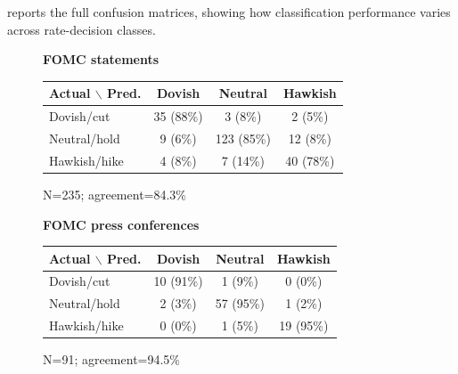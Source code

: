  reports the full confusion matrices, showing how
classification performance varies across rate-decision classes.

\begin{figure}[H]
  \centering
\begin{minipage}{0.48\textwidth}
\centering
\scriptsize
\textbf{FOMC statements}\par
\vspace{0.08cm}
\begin{tabular}{lccc}
\toprule
Actual $\backslash$ Pred. & Dovish & Neutral & Hawkish \\
\midrule
Dovish/cut & 35 (88\%) & 3 (8\%) & 2 (5\%) \\
Neutral/hold & 9 (6\%) & 123 (85\%) & 12 (8\%) \\
Hawkish/hike & 4 (8\%) & 7 (14\%) & 40 (78\%) \\
\bottomrule
\end{tabular}
\vspace{0.05cm}
\par N=235; agreement=84.3\%
\end{minipage}
\hfill
\begin{minipage}{0.48\textwidth}
\centering
\scriptsize
\textbf{FOMC press conferences}\par
\vspace{0.08cm}
\begin{tabular}{lccc}
\toprule
Actual $\backslash$ Pred. & Dovish & Neutral & Hawkish \\
\midrule
Dovish/cut & 10 (91\%) & 1 (9\%) & 0 (0\%) \\
Neutral/hold & 2 (3\%) & 57 (95\%) & 1 (2\%) \\
Hawkish/hike & 0 (0\%) & 1 (5\%) & 19 (95\%) \\
\bottomrule
\end{tabular}
\vspace{0.05cm}
\par N=91; agreement=94.5\%
\end{minipage}


\end{figure}
